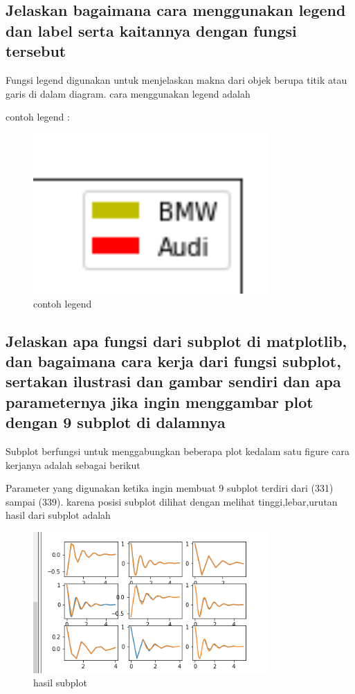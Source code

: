 \subsection{Jelaskan bagaimana cara menggunakan legend dan label serta kaitannya dengan fungsi tersebut}
Fungsi legend digunakan untuk menjelaskan makna dari objek berupa titik atau garis di dalam diagram.
cara menggunakan legend adalah 

contoh legend :
\begin{figure}[H]
    \includegraphics[width=9cm]{figures/6/Teori/1174096/4legend.png}
    \caption{contoh legend}
    \centering
\end{figure}

\subsection{Jelaskan apa fungsi dari subplot di matplotlib, dan bagaimana cara kerja dari fungsi subplot, sertakan ilustrasi dan gambar sendiri dan apa parameternya jika ingin menggambar plot dengan 9 subplot di dalamnya}
Subplot berfungsi untuk menggabungkan beberapa plot kedalam satu figure
cara kerjanya adalah sebagai berikut

Parameter yang digunakan ketika ingin membuat 9 subplot terdiri dari (331) sampai (339). karena posisi subplot dilihat dengan melihat tinggi,lebar,urutan
hasil dari subplot adalah
\begin{figure}[H]
    \includegraphics[width=9cm]{figures/6/Teori/1174096/5subplot.png}
    \caption{hasil subplot}
    \centering
\end{figure}

